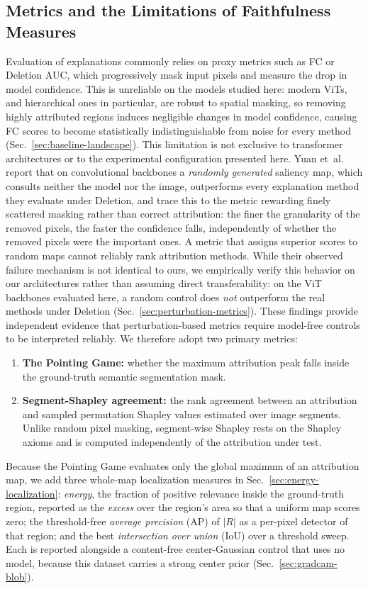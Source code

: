 \documentclass[lettersize,journal]{IEEEtran}
\theoremstyle{definition}
\theoremstyle{plain}
\begin{document}
\subsection{Metrics and the Limitations of Faithfulness Measures}
Evaluation of explanations commonly relies on proxy metrics such as FC or Deletion AUC, which progressively mask input pixels and measure the drop in model confidence. This is unreliable on the models studied here: modern ViTs, and hierarchical ones in particular, are robust to spatial masking, so removing highly attributed regions induces negligible changes in model confidence, causing FC scores to become statistically indistinguishable from noise for every method (Sec.~\ref{sec:baseline-landscape}). This limitation is not exclusive to transformer architectures or to the experimental configuration presented here. Yuan et~al.~\cite{yuan2025fourchar} report that on convolutional backbones a \emph{randomly generated} saliency map, which consults neither the model nor the image, outperforms every explanation method they evaluate under Deletion, and trace this to the metric rewarding finely scattered masking rather than correct attribution: the finer the granularity of the removed pixels, the faster the confidence falls, independently of whether the removed pixels were the important ones. A metric that assigns superior scores to random maps cannot reliably rank attribution methods. While their observed failure mechanism is not identical to ours, we empirically verify this behavior on our architectures rather than assuming direct transferability: on the ViT backbones evaluated here, a random control does \emph{not} outperform the real methods under Deletion (Sec.~\ref{sec:perturbation-metrics}). These findings provide independent evidence that perturbation-based metrics require model-free controls to be interpreted reliably. We therefore adopt two primary metrics:
\begin{enumerate}
    \item \textbf{The Pointing Game:} whether the maximum attribution peak falls inside the ground-truth semantic segmentation mask.
    \item \textbf{Segment-Shapley agreement:} the rank agreement between an attribution and sampled permutation Shapley values estimated over image segments. Unlike random pixel masking, segment-wise Shapley rests on the Shapley axioms and is computed independently of the attribution under test.
\end{enumerate}

Because the Pointing Game evaluates only the global maximum of an attribution map, we add three whole-map localization measures in Sec.~\ref{sec:energy-localization}: \emph{energy}, the fraction of positive relevance inside the ground-truth region, reported as the \emph{excess} over the region's area so that a uniform map scores zero; the threshold-free \emph{average precision} (AP) of $|R|$ as a per-pixel detector of that region; and the best \emph{intersection over union} (IoU) over a threshold sweep. Each is reported alongside a content-free center-Gaussian control that uses no model, because this dataset carries a strong center prior (Sec.~\ref{sec:gradcam-blob}).
\end{document}
